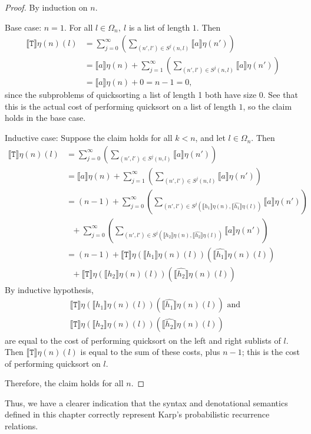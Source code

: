 \begin{proof}
By induction on $n$.

Base case: $n = 1$.  For all $l \in \Omega_n, \ l$ is a list of length $1$. Then
\begin{align*}
\llbracket \texttt{T} \rrbracket\eta (n)(l) &=  \sum_{j=0}^{\infty}(\sum_{(n',l') \in S^j(n,l)} \llbracket a \rrbracket\eta(n')) \\
&= \llbracket a \rrbracket\eta(n) + \sum_{j=1}^{\infty}(\sum_{(n',l') \in S^j(n,l)} \llbracket a \rrbracket\eta(n')) \\
&= \llbracket a \rrbracket\eta(n) + 0 = n - 1 = 0,
\end{align*}
since the subproblems of quicksorting a list of length 1 both have size $0$. See that this is the actual cost of performing
quicksort on a list of length $1$, so the claim holds in the base case.

Inductive case: Suppose the claim holds for all $k < n$, and let $l \in \Omega_n$. Then
\begin{align*}
 \llbracket \texttt{T} \rrbracket\eta (n)(l) &=  \sum_{j=0}^{\infty}(\sum_{(n',l') \in S^j(n,l)} \llbracket a \rrbracket\eta(n')) \\
 &= \llbracket a \rrbracket\eta(n) + \sum_{j=1}^{\infty}(\sum_{(n',l') \in S^j(n,l)} \llbracket a \rrbracket\eta(n')) \\
&= (n-1) + \sum_{j=0}^{\infty}(\sum_{(n',l') \in S^j(\llbracket h_1 \rrbracket\eta(n),
\llbracket \hat{h_1} \rrbracket \eta(l))} \llbracket a \rrbracket\eta(n')) \\
 & \text{ \ \ \ \ \ \ \ \ \ \ \ \ } + \sum_{j=0}^{\infty}(\sum_{(n',l') \in S^j(\llbracket h_2 \rrbracket \eta(n),
 \llbracket \hat{h_2} \rrbracket \eta(l))} \llbracket a \rrbracket\eta(n')) \\
 &= (n-1) + \llbracket \texttt{T} \rrbracket\eta(\llbracket h_1 \rrbracket\eta(n)(l))(\llbracket \hat{h_1} \rrbracket\eta(n)(l)) \\
 &\text{ \ \ \ \ \ \ \ \ \ \ \ \ }+  \llbracket \texttt{T} \rrbracket\eta(\llbracket h_2 \rrbracket\eta(n)(l))(\llbracket \hat{h_2} \rrbracket\eta(n)(l))  
\end{align*}
By inductive hypothesis, 
\begin{align*}
&\llbracket \texttt{T} \rrbracket\eta(\llbracket h_1 \rrbracket\eta(n)(l))(\llbracket \hat{h_1} \rrbracket\eta(n)(l)) \text{ and } \\
&\llbracket \texttt{T} \rrbracket\eta(\llbracket h_2 \rrbracket\eta(n)(l))(\llbracket \hat{h_2} \rrbracket\eta(n)(l))
\end{align*}
 are equal
to the cost of performing quicksort on the left and right sublists of $l$. Then $\llbracket \texttt{T} \rrbracket\eta (n)(l)$ is equal 
to the sum of these costs, plus $n-1$; this is the cost of performing quicksort on $l$.

Therefore, the claim holds for all $n$.
\end{proof}
Thus, we have a clearer indication that the syntax and denotational semantics defined in this chapter correctly 
represent Karp's probabilistic recurrence relations.

